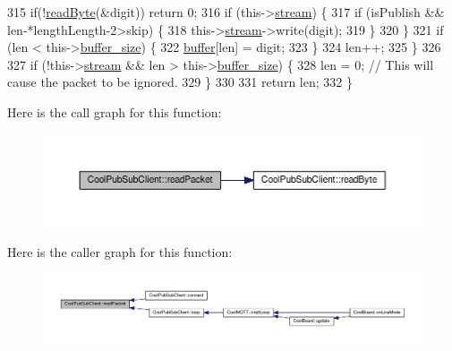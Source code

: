 \begin{DoxyCode}
315         \textcolor{keywordflow}{if}(!\hyperlink{class_cool_pub_sub_client_ad409bbd287d5894f0cf082f62446c002}{readByte}(&digit)) \textcolor{keywordflow}{return} 0;
316         \textcolor{keywordflow}{if} (this->\hyperlink{class_cool_pub_sub_client_a7a92417b317e7bd9502ed37752111705}{stream}) \{
317             \textcolor{keywordflow}{if} (isPublish && len-*lengthLength-2>skip) \{
318                 this->\hyperlink{class_cool_pub_sub_client_a7a92417b317e7bd9502ed37752111705}{stream}->write(digit);
319             \}
320         \}
321         \textcolor{keywordflow}{if} (len < this->\hyperlink{class_cool_pub_sub_client_ae6cb10e42c057483d53516ac830ab526}{buffer\_size}) \{
322             \hyperlink{class_cool_pub_sub_client_a7e8bcc6096626916046a51bebadc7851}{buffer}[len] = digit;
323         \}
324         len++;
325     \}
326 
327     \textcolor{keywordflow}{if} (!this->\hyperlink{class_cool_pub_sub_client_a7a92417b317e7bd9502ed37752111705}{stream} && len > this->\hyperlink{class_cool_pub_sub_client_ae6cb10e42c057483d53516ac830ab526}{buffer\_size}) \{
328         len = 0; \textcolor{comment}{// This will cause the packet to be ignored.}
329     \}
330 
331     \textcolor{keywordflow}{return} len;
332 \}
\end{DoxyCode}
Here is the call graph for this function\+:\nopagebreak
\begin{figure}[H]
\begin{center}
\leavevmode
\includegraphics[width=350pt]{d8/d4b/class_cool_pub_sub_client_a25a8779149cfa809b7c06f63568b25cf_cgraph}
\end{center}
\end{figure}
Here is the caller graph for this function\+:\nopagebreak
\begin{figure}[H]
\begin{center}
\leavevmode
\includegraphics[width=350pt]{d8/d4b/class_cool_pub_sub_client_a25a8779149cfa809b7c06f63568b25cf_icgraph}
\end{center}
\end{figure}
\mbox{\label{class_cool_pub_sub_client_a4f83e54f1ba96e32f725d93cdec283b7}} 
